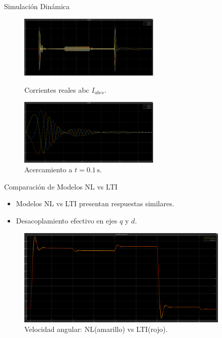 \documentclass[12pt]{beamer}
\begin{document}
\begin{frame}{Simulación Dinámica}\scriptsize
\begin{figure}[H]
    \centering
    \begin{minipage}[t]{0.9\textwidth}
        \centering
        \includegraphics[width=0.6\textwidth]{Imagenes/CorrientesABCSimulacion.png}
        \caption{Corrientes reales abc \(I_{abcs}\).}
        \label{fig:CorrientesRealesGlobalDT}
    \end{minipage}
    \begin{minipage}[t]{0.9\textwidth}
        \centering
        \includegraphics[width=0.6\textwidth]{Imagenes/CorrientesABCacercamientoSimulacion.png}
        \caption{Acercamiento a $t = 0{.}1\,\text{s}$.}
        \label{fig:CorrientesRealesAcercamientoGlobalDT}
    \end{minipage}
    \label{fig:SimulaciónCorrientesCoordenadasReales}
\end{figure}
\end{frame}


\begin{frame}{Comparación de Modelos NL vs LTI}\scriptsize
\begin{itemize}
\footnotesize
    \item Modelos NL vs LTI presentan respuestas similares.
    \item Desacoplamiento efectivo en ejes \( q \) y \( d \).
\end{itemize}

\begin{figure}[h]
    \centering
    \includegraphics[width=0.9\textwidth]{Imagenes/ComparativaVelocidadAngular.png}
    \caption{Velocidad angular: NL(amarillo) vs LTI(rojo).}
\end{figure}
\end{frame}
\end{document}

